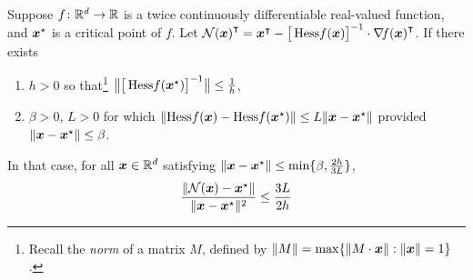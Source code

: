 \begin{theorem}\label{theorem:QuadraticConvergence}
Suppose $f\colon \mathbb{R}^d \to \mathbb{R}$ is a twice continuously differentiable real-valued function, and $\boldsymbol{x}^{\star}$ is a critical point of $f$. Let ${\mathcal{N}(\boldsymbol{x})}^\intercal = {\boldsymbol{x}}^\intercal - \big[ \mathop{\mathrm{Hess}{f}}(\boldsymbol{x}) \big]^{-1} \cdot {\mathop{\nabla\! {f}}(\boldsymbol{x})}^\intercal$. If there exists 
\begin{enumerate}
	\item $h>0$ so that\footnote{Recall the \emph{norm} of a matrix $M$, defined by $\lVert M \rVert = \max\{ \lVert M\cdot \boldsymbol{x} \rVert : \lVert \boldsymbol{x} \rVert=1 \}$.} $\big\lVert \big[ \mathop{\mathrm{Hess}{f}}(\boldsymbol{x}^{\star})\big]^{-1} \big\rVert \leq \tfrac{1}{h}$,
	\item $\beta>0$, $L>0$ for which $\lVert \mathop{\mathrm{Hess}{f}}(\boldsymbol{x}) - \mathop{\mathrm{Hess}{f}}(\boldsymbol{x}^{\star}) \rVert \leq L \lVert  \boldsymbol{x} - \boldsymbol{x}^{\star}  \rVert$ provided $\lVert  \boldsymbol{x} - \boldsymbol{x}^{\star}  \rVert\leq \beta$.
\end{enumerate}
In that case, for all $\boldsymbol{x} \in \mathbb{R}^d$ satisfying $\lVert  \boldsymbol{x} - \boldsymbol{x}^{\star}  \rVert\leq \min \{\beta, \tfrac{2h}{3L} \}$,
\begin{equation*}
\frac{\lVert  \mathcal{N}(\boldsymbol{x}) - \boldsymbol{x}^{\star}  \rVert}{\lVert \boldsymbol{x} - \boldsymbol{x}^{\star} \rVert^2} \leq \frac{3L}{2h}
\end{equation*}
\end{theorem}